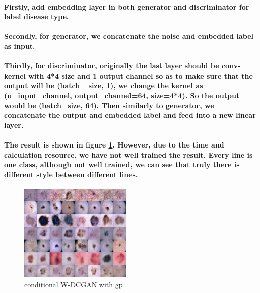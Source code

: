 \paragraph{
Firstly, add embedding layer in both generator and discriminator for label disease type. 
}
\paragraph{
Secondly, for generator, we concatenate the noise and embedded label as input. }
\paragraph{
Thirdly, for discriminator, originally the last layer should be conv-kernel with 4*4 size and 1 output channel so as to make sure that the output will be (batch\_ size, 1), 
we change the kernel as (n\_input\_channel, output\_channel=64, size=4*4). So the output would be (batch\_size, 64). Then similarly to generator, we concatenate the output and embedded label and feed into a new linear layer.}
\paragraph{ The result is shown in figure \ref{fig:cgan}. However, due to the time and calculation resource, we have not well trained the result. Every line is one class, although not well trained, we can see that truly  there is different style between different lines.}




\begin{figure}[htbp]
    \centering
    
    \includegraphics[width=2.1in]{images/week5/cGAN.png}
    
    \caption{conditional W-DCGAN with gp }
    \label{fig:cgan}
\end{figure}